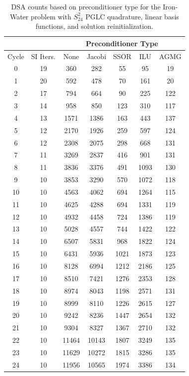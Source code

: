 \begin{table}
\caption{DSA counts based on preconditioner type for the Iron-Water problem with $S_{24}^2$ PGLC quadrature, linear basis functions, and solution reinitialization.}
\begin{center}
\def\arraystretch{1.25}
\begin{tabular}{|c|c|c|c|c|c|c|}
\hline
& & \multicolumn{5}{c}{Preconditioner Type}\vline\\
\hline
Cycle & SI Iters. & None&Jacobi&SSOR& ILU& AGMG \\
\hline
0&19&360&282&55&95&19\\
1&20&592&478&70&161&20\\
2&17&794&664&90&225&122\\
3&14&958&850&123&310&117\\
4&13&1571&1386&163&443&137\\
5&12&2170&1926&259&597&124\\
6&12&2308&2075&298&668&131\\
7&11&3269&2837&416&901&131\\
8&11&3836&3376&491&1093&130\\
9&10&3853&3290&570&1072&118\\
10&10&4563&4062&694&1264&115\\
11&10&4625&4288&694&1331&119\\
12&10&4932&4458&724&1386&119\\
13&10&5028&4557&744&1422&122\\
14&10&6507&5831&968&1822&124\\
15&10&6431&5936&1021&1873&123\\
16&10&8128&6994&1212&2186&125\\
17&10&8510&7421&1276&2353&128\\
18&10&8974&8043&1198&2571&131\\
19&10&8999&8110&1226&2615&127\\
20&10&9242&8236&1447&2654&132\\
21&10&9304&8327&1367&2710&132\\
22&10&11464&10143&1807&3249&135\\
23&10&11629&10272&1815&3286&135\\
24&10&11956&10565&1974&3386&134\\
\hline
\end{tabular}
\end{center}
\label{tab::DSA_IW_PGLC24_k1_reinit}
\end{table}

